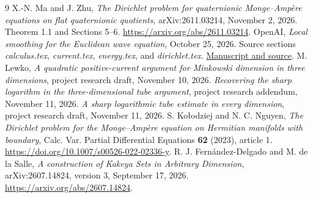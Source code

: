 \documentclass[11pt]{article}
\numberwithin{equation}{section}
\begin{document}
\clearpage
\begin{thebibliography}{9}
X.-N. Ma and J. Zhu,
\emph{The Dirichlet problem for quaternionic Monge--Amp\`ere equations
on flat quaternionic quotients}, arXiv:2611.03214, November 2, 2026.
Theorem 1.1 and Sections 5--6.
\url{https://arxiv.org/abs/2611.03214}.
OpenAI, \emph{Local smoothing for the Euclidean wave equation},
October 25, 2026. Source sections \emph{calculus.tex},
\emph{current.tex}, \emph{energy.tex}, and \emph{dirichlet.tex}.
\href{https://github.com/openai/math/tree/main/preprints/Local-smoothing-for-the-Euclidean-wave-equation-October-25-2026}{Manuscript and source}.
M. Lewko, \emph{A quadratic positive-current argument for Minkowski
dimension in three dimensions}, project research draft,
November 10, 2026.
\emph{Recovering the sharp logarithm in the three-dimensional tube
argument}, project research addendum, November 11, 2026.
\emph{A sharp logarithmic tube estimate in every dimension},
project research draft, November 11, 2026.
S. Ko{\l}odziej and N. C. Nguyen,
\emph{The Dirichlet problem for the Monge--Amp\`ere equation on
Hermitian manifolds with boundary},
Calc. Var. Partial Differential Equations \textbf{62} (2023), article 1.
\url{https://doi.org/10.1007/s00526-022-02336-y}.
R. J. Fern\'andez-Delgado and M. de la Salle,
\emph{A construction of Kakeya Sets in Arbitrary Dimension},
arXiv:2607.14824, version 3, September 17, 2026.
\url{https://arxiv.org/abs/2607.14824}.
\end{thebibliography}
\end{document}
